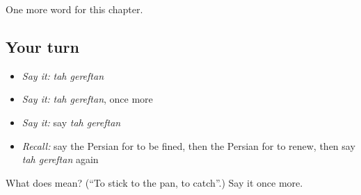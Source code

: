 \begin{grammarlens}[title={What you've built}]
One more word for this chapter.
\end{grammarlens}

\subsection*{Your turn}
\begin{itemize}
\raggedright
  \item \emph{Say it:} \emph{tah gereftan}
  \item \emph{Say it:} \emph{tah gereftan}, once more
  \item \emph{Say it:} say \emph{tah gereftan}
  \item \emph{Recall:} say the Persian for to be fined, then the Persian for to renew, then say \emph{tah gereftan} again
\end{itemize}

\begin{tcolorbox}[breakable,colback=teal!4,colframe=teal!35!black,title={Before you move on}]
What does   mean? (\textquotedblleft{}To stick to the pan, to catch\textquotedblright{}.) Say it once more.
\end{tcolorbox}
